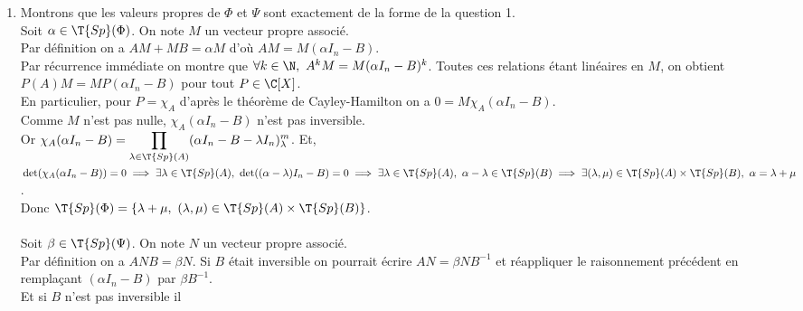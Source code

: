 \documentclass[8pt]{book}
\begin{document}
\begin{enumerate}[leftmargin=*]
		En effet, en notant $\B_c=(E_{ij})_{1\leq i,j\leq n}$ la base canonique de $\M_n(\C)$, les coefficients de $AM+MB$ et $AMB$ étant polynomiaux en ceux de $A,M,B$, il est clair que les coordonnées de $E_{ij}$ dans la base $\B_c$ sont entières. Ainsi $\Mat_{\B_c}(\Phi),\Mat_{\B_c}(\Psi)\in \M_n(\Z)$.\\
		Enfin, comme les coefficients de $\chi_M$ sont polynomiaux en ceux de $M$ (c'est un calcul de déterminant) on a $\chi_\Phi,\chi_\Psi\in \Z[X]$.\\
		On en déduit que $\lambda+\mu$ et $\lambda\mu$ sont des entiers algébriques et on conclut que les entiers algébriques forment un  sous-anneau de $\C$.\\
		\textit{Remarque : ce n'est pas un corps puisque $2$ est un entier algébrique alors que $\dfrac{1}{2}$ n'en est pas un.}
		\item Montrons que les valeurs propres de $\Phi$ et $\Psi$ sont exactement de la forme de la question 1.\\
		Soit $\alpha\in \T{Sp}(\Phi)$. On note $M$ un vecteur propre associé.\\
		Par définition on a $AM+MB=\alpha M$ d'où $AM=M(\alpha I_n-B)$.\\
		Par récurrence immédiate on montre que $\forall k\in \N,\ A^kM=M(\alpha I_n-B)^k$. Toutes ces relations étant linéaires en $M$, on obtient $P(A)M=MP(\alpha I_n-B)$ pour tout $P\in \C[X]$.\\
		En particulier, pour $P=\chi_A$ d'après le théorème de Cayley-Hamilton on a $0=M\chi_A(\alpha I_n-B)$.\\
		Comme $M$ n'est pas nulle, $\chi_A(\alpha I_n-B)$ n'est pas inversible.\\
		Or $\chi_A(\alpha I_n-B)=\displaystyle\prod_{\lambda\in \T{Sp}(A)}(\alpha I_n-B-\lambda I_n)^m_\lambda$. Et,\\
		$\det(\chi_A(\alpha I_n-B))=0\implies \exists \lambda\in \T{Sp}(A),\ \det((\alpha-\lambda)I_n-B)=0\implies \exists \lambda\in \T{Sp}(A),\ \alpha-\lambda\in \T{Sp}(B)\implies \exists (\lambda,\mu)\in \T{Sp}(A)\times\T{Sp}(B),\ \alpha=\lambda+\mu$.\\
		Donc $\T{Sp}(\Phi)=\{\lambda+\mu,\ (\lambda,\mu)\in \T{Sp}(A)\times\T{Sp}(B)\}$.\\\\
		Soit $\beta\in \T{Sp}(\Psi)$. On note $N$ un vecteur propre associé.\\
		Par définition on a $ANB=\beta N$. Si $B$ était inversible on pourrait écrire $AN=\beta NB^{-1}$ et réappliquer le raisonnement précédent en remplaçant $(\alpha I_n-B)$ par $\beta B^{-1}$.\\
		Et si $B$ n'est pas inversible il 
	\end{enumerate}
	
\end{document}
